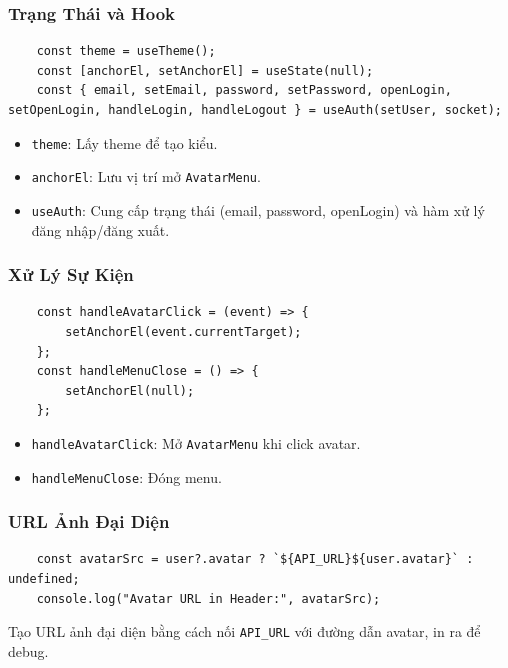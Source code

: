             \subsubsection{Trạng Thái và Hook}
                \begin{lstlisting}
    const theme = useTheme();
    const [anchorEl, setAnchorEl] = useState(null);
    const { email, setEmail, password, setPassword, openLogin, setOpenLogin, handleLogin, handleLogout } = useAuth(setUser, socket);
                \end{lstlisting}
                \begin{itemize}
                    \item \texttt{theme}: Lấy theme để tạo kiểu.
                    \item \texttt{anchorEl}: Lưu vị trí mở \texttt{AvatarMenu}.
                    \item \texttt{useAuth}: Cung cấp trạng thái (email, password, openLogin) và hàm xử lý đăng nhập/đăng xuất.
                \end{itemize}

            \subsubsection{Xử Lý Sự Kiện}
                \begin{lstlisting}
    const handleAvatarClick = (event) => {
        setAnchorEl(event.currentTarget);
    };
    const handleMenuClose = () => {
        setAnchorEl(null);
    };
                \end{lstlisting}
                \begin{itemize}
                    \item \texttt{handleAvatarClick}: Mở \texttt{AvatarMenu} khi click avatar.
                    \item \texttt{handleMenuClose}: Đóng menu.
                \end{itemize}

            \subsubsection{URL Ảnh Đại Diện}
                \begin{lstlisting}
    const avatarSrc = user?.avatar ? `${API_URL}${user.avatar}` : undefined;
    console.log("Avatar URL in Header:", avatarSrc);
                \end{lstlisting}
                Tạo URL ảnh đại diện bằng cách nối \texttt{API\_URL} với đường dẫn avatar, in ra để debug.

